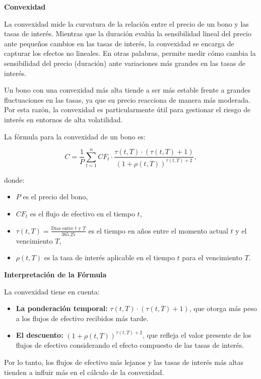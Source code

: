 \documentclass[12pt]{article}
\begin{document}
\noindent \textbf{Convexidad}

La convexidad mide la curvatura de la relación entre el precio de un bono y las tasas de interés. Mientras que la duración evalúa la sensibilidad lineal del precio ante pequeños cambios en las tasas de interés, la convexidad se encarga de capturar los efectos no lineales. En otras palabras, permite medir cómo cambia la sensibilidad del precio (duración) ante variaciones más grandes en las tasas de interés.

Un bono con una convexidad más alta tiende a ser más estable frente a grandes fluctuaciones en las tasas, ya que su precio reacciona de manera más moderada. Por esta razón, la convexidad es particularmente útil para gestionar el riesgo de interés en entornos de alta volatilidad.

La fórmula para la convexidad de un bono es:

\[
C = \frac{1}{P} \sum_{t=1}^n CF_t \cdot \frac{\tau(t,T) \cdot (\tau(t,T) + 1)}{(1 + \rho(t, T))^{\tau(t,T) + 2}},
\]

donde:
\begin{itemize}
    \item \(P\) es el precio del bono,
    \item \(CF_t\) es el flujo de efectivo en el tiempo \(t\),
    \item \( \tau(t,T) = \frac{\text{Días entre } t \text{ y } T}{365.25} \) es el tiempo en años entre el momento actual \(t\) y el vencimiento \(T\),
    \item \( \rho(t,T) \) es la tasa de interés aplicable en el tiempo \(t\) para el vencimiento \(T\).
\end{itemize}

\noindent \textbf{Interpretación de la Fórmula}

La convexidad tiene en cuenta:
\begin{itemize}
    \item \textbf{La ponderación temporal:} \( \tau(t,T) \cdot (\tau(t,T) + 1) \), que otorga más peso a los flujos de efectivo recibidos más tarde.
    \item \textbf{El descuento:} \( (1 + \rho(t,T))^{\tau(t,T) + 2} \), que refleja el valor presente de los flujos de efectivo considerando el efecto compuesto de las tasas de interés.
\end{itemize}

Por lo tanto, los flujos de efectivo más lejanos y las tasas de interés más altas tienden a influir más en el cálculo de la convexidad.
\end{document}
